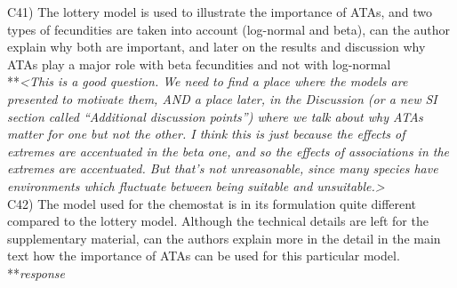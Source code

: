 \documentclass[letterpaper,11pt]{article}
\begin{document}
\noindent C41) The lottery model is used to illustrate the importance of ATAs, and two types of fecundities are taken into account (log-normal and beta), can the author explain why both are important, and later on the results and discussion why ATAs play a major role with beta fecundities and not with log-normal \\

\noindent ***\emph{<This is a good question. We need to find a place where the models are presented to motivate
them, AND a place later, in the Discussion (or a new SI section called ``Additional discussion points'') where
we talk about why ATAs matter for one but not the other. I think this is just because the
effects of extremes are accentuated in the beta one, and so the effects of associations in the extremes are
accentuated. But that's not unreasonable, since many species have environments which fluctuate between
being suitable and unsuitable.>} \\

\noindent C42) The model used for the chemostat is in its formulation quite different compared to the lottery model. Although the technical details are left for the supplementary material, can the authors explain more in the detail in the main text how the importance of ATAs can be used for this particular model. \\

\noindent ***\emph{response} \\
\end{document}
